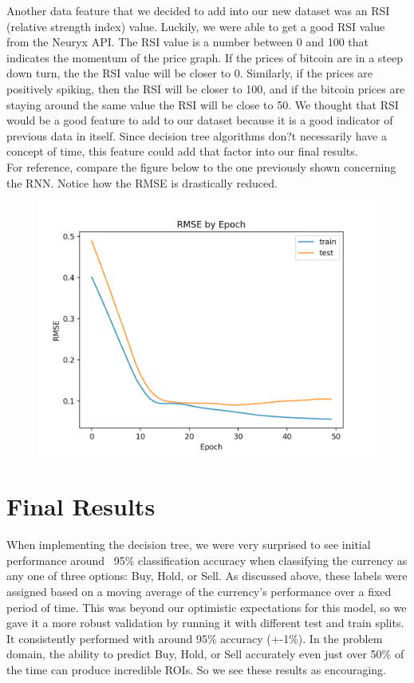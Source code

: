 \documentclass{article}
\begin{document}
Another data feature that we decided to add into our new dataset was an RSI (relative strength index) value. Luckily, we were able to get a good RSI value from the Neuryx API. The RSI value is a number between 0 and 100 that indicates the momentum of the price graph. If the prices of bitcoin are in a steep down turn, the the RSI value will be closer to 0. Similarly, if the prices are positively spiking, then the RSI will be closer to 100, and if the bitcoin prices are staying around the same value the RSI will be close to 50. We thought that RSI would be a good feature to add to our dataset because it is a good indicator of previous data in itself. Since decision tree algorithms don?t necessarily have a concept of time, this feature could add that factor into our final results. \\

For reference, compare the figure below to the one previously shown concerning the RNN. Notice how the RMSE is drastically reduced.

\begin{figure}[H]
	\includegraphics[scale=0.55 ]{../pic/rnn_new.png}
\end{figure}


\section{ Final Results }

When implementing the decision tree, we were very surprised to see initial performance around ~95\% classification accuracy when classifying the currency as any one of three options: Buy, Hold, or Sell. As discussed above, these labels were assigned based on a moving average of the currency's performance over a fixed period of time. This was beyond our optimistic expectations for this model, so we gave it a more robust validation by running it with different test and train splits. It consistently performed with around 95\% accuracy (+-1\%). In the problem domain, the ability to predict Buy, Hold, or Sell accurately even just over 50\% of the time can produce incredible ROIs. So we see these results as encouraging. \\
\end{document}
